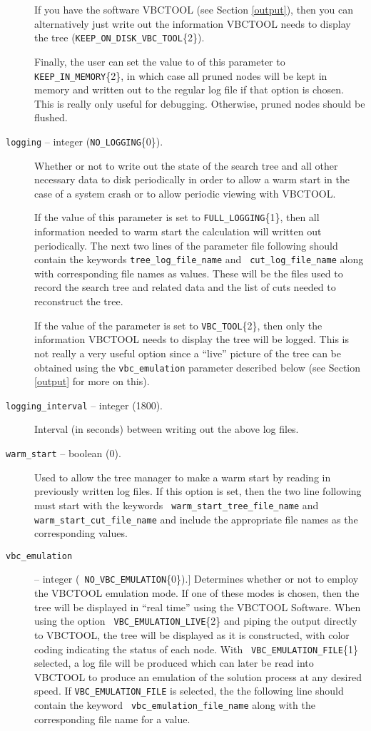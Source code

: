 \begin{description}
If you have the software VBCTOOL (see Section \ref{output}), then
you can alternatively just write out the information VBCTOOL needs to
display the tree ({\tt KEEP\_ON\_DISK\_VBC\_TOOL}\{2\}). 

Finally, the user can set the value to of this parameter to {\tt
KEEP\_IN\_MEMORY}\{2\}, in which case all pruned nodes will be kept in
memory and written out to the regular log file if that option is
chosen. This is really only useful for debugging. Otherwise, pruned
nodes should be flushed.

\item[{\tt logging} -- integer ({\tt NO\_LOGGING}\{0\}).]
Whether or not to write out the state of the search tree and all other
necessary data to disk periodically in order to allow a warm start in
the case of a system crash or to allow periodic viewing with VBCTOOL.

If the value of this parameter is set to {\tt FULL\_LOGGING}\{1\},
then all information needed to warm start the calculation will written
out periodically. The next two lines of the parameter file following
should contain the keywords {\tt tree\_log\_file\_name} and {\tt
cut\_log\_file\_name} along with corresponding file names as values.
These will be the files used to record the search tree and related
data and the list of cuts needed to reconstruct the tree.

If the value of the parameter is set to {\tt VBC\_TOOL}\{2\}, then
only the information VBCTOOL needs to display the tree will be
logged. This is not really a very useful option since a ``live'' picture
of the tree can be obtained using the {\tt vbc\_emulation} parameter
described below (see Section \ref{output} for more on this).

\item[{\tt logging\_interval} -- integer (1800).]
Interval (in seconds) between writing out the above log files.

\item[{\tt warm\_start} -- boolean (0).]
Used to allow the tree manager to make a warm start by reading in
previously written log files. If this option is set, then the two line
following must start with the keywords {\tt
warm\_start\_tree\_file\_name} and {\tt warm\_start\_cut\_file\_name}
and include the appropriate file names as the corresponding values.

\item[{\tt vbc\_emulation}] -- integer ({\tt
NO\_VBC\_EMULATION}\{0\}).]
Determines whether or not to employ the VBCTOOL emulation mode. If
one of these modes is chosen, then the tree will be displayed in
``real time'' using the VBCTOOL Software. When using the option {\tt
VBC\_EMULATION\_LIVE}\{2\} and piping the output directly to VBCTOOL, the
tree will be displayed as it is constructed, with color coding
indicating the status of each node. With {\tt
VBC\_EMULATION\_FILE}\{1\} selected, a log file will be produced which
can later be read into VBCTOOL to produce an emulation of the
solution process at any desired speed. If {\tt VBC\_EMULATION\_FILE}
is selected, the the following line should contain the keyword {\tt
vbc\_emulation\_file\_name} along with the corresponding file name
for a value.


\end{description}
